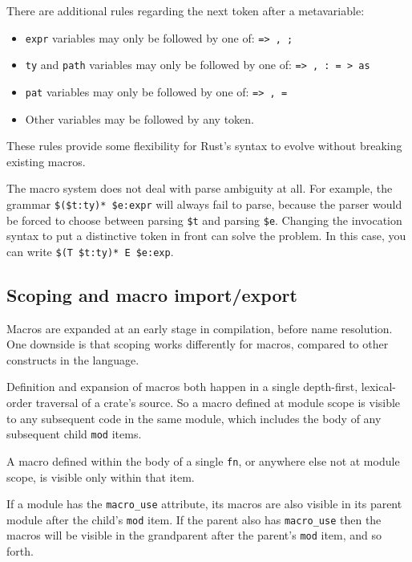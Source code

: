 \documentclass[a4paper,]{book}
\begin{document}
There are additional rules regarding the next token after a
metavariable:

\begin{itemize}
\itemsep1pt\parskip0pt
\item
  \texttt{expr} variables may only be followed by one of:
  \texttt{=\textgreater{}\ ,\ ;}
\item
  \texttt{ty} and \texttt{path} variables may only be followed by one
  of: \texttt{=\textgreater{}\ ,\ :\ =\ \textgreater{}\ as}
\item
  \texttt{pat} variables may only be followed by one of:
  \texttt{=\textgreater{}\ ,\ =}
\item
  Other variables may be followed by any token.
\end{itemize}

These rules provide some flexibility for Rust's syntax to evolve without
breaking existing macros.

The macro system does not deal with parse ambiguity at all. For example,
the grammar \texttt{\$(\$t:ty)*\ \$e:expr} will always fail to parse,
because the parser would be forced to choose between parsing
\texttt{\$t} and parsing \texttt{\$e}. Changing the invocation syntax to
put a distinctive token in front can solve the problem. In this case,
you can write \texttt{\$(T\ \$t:ty)*\ E\ \$e:exp}.

\subsection{Scoping and macro
import/export}\label{scoping-and-macro-importexport}

Macros are expanded at an early stage in compilation, before name
resolution. One downside is that scoping works differently for macros,
compared to other constructs in the language.

Definition and expansion of macros both happen in a single depth-first,
lexical-order traversal of a crate's source. So a macro defined at
module scope is visible to any subsequent code in the same module, which
includes the body of any subsequent child \texttt{mod} items.

A macro defined within the body of a single \texttt{fn}, or anywhere
else not at module scope, is visible only within that item.

If a module has the \texttt{macro\_use} attribute, its macros are also
visible in its parent module after the child's \texttt{mod} item. If the
parent also has \texttt{macro\_use} then the macros will be visible in
the grandparent after the parent's \texttt{mod} item, and so forth.
\end{document}
